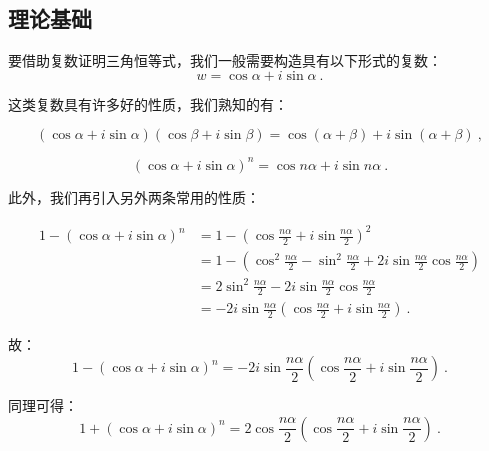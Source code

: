 
\begin{issues}
\issueTODO
\end{issues}


\subsection{理论基础}
要借助复数证明三角恒等式，我们一般需要构造具有以下形式的复数：
$$w=\cos \alpha+i\sin\alpha~.$$

这类复数具有许多好的性质，我们熟知的有：

\begin{equation}%
(\cos\alpha+i\sin\alpha)(\cos\beta+i\sin\beta)=\cos(\alpha+\beta)+i\sin(\alpha+\beta)~,
\end{equation}

\begin{equation}%
(\cos\alpha+i\sin\alpha)^n=\cos n\alpha+i\sin n\alpha~.
\end{equation}

此外，我们再引入另外两条常用的性质：

$$\begin{aligned}
 1-(\cos\alpha+i\sin\alpha)^n&=1-\left(\cos{\frac{n\alpha}2+i\sin{\frac{n\alpha}2}}\right)^{2}\\ &=1-\left(\cos^2{\frac{n\alpha}2}-\sin^2{\frac{n\alpha}2}+2i\sin{\frac{n\alpha}2}\cos{\frac{n\alpha}2}\right)\\ &=2\sin^2{\frac{n\alpha}2}-2i\sin{\frac{n\alpha}2}\cos{\frac{n\alpha}2}\\ &=-2i\sin{\frac{n\alpha}2}\left(\cos{\frac{n\alpha}2}+i\sin{\frac{n\alpha}2}\right) ~.
\end{aligned}$$

故：
\begin{equation}\label{eq_TriCom_4}
1-(\cos\alpha+i\sin\alpha)^n=-2i\sin{\frac{n\alpha}2}\left(\cos{\frac{n\alpha}2}+i\sin{\frac{n\alpha}2}\right)~.
\end{equation}

同理可得：
\begin{equation}\label{eq_TriCom_5}%
1+(\cos\alpha+i\sin\alpha)^n=2\cos{\frac{n\alpha}2}\left(\cos{\frac{n\alpha}2}+i\sin{\frac{n\alpha}2}\right)~.
\end{equation}

